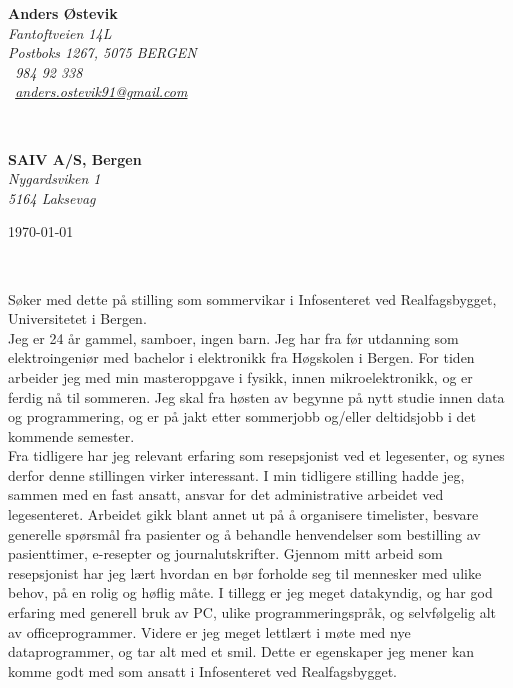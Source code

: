 \documentclass[11pt, norsk]{article}
\begin{document}
\sffamily   %
\hfill%
\begin{minipage}[t]{.6\textwidth}
\raggedleft%
{\bfseries Anders Østevik}\\[.35ex]
\small\itshape%
Fantoftveien 14L\\
Postboks 1267, 5075 BERGEN\\[.35ex]
\Telefon~984 92 338\\
\Letter~\href{mailto:anders.ostevik91@gmail.com}{anders.ostevik91@gmail.com}
\end{minipage}\\[1em]
%
\begin{minipage}[t]{.4\textwidth}
\raggedright%
{\bfseries SAIV A/S, Bergen}\\[.35ex]
\small\itshape%
Nygardsviken 1\\
5164 Laksevag
\end{minipage}
\hfill %
\begin{minipage}[t]{.4\textwidth}
\raggedleft %
\today
\end{minipage}\\[2em]
\raggedright

%
Søker med dette på stilling som sommervikar i Infosenteret ved Realfagsbygget, Universitetet i Bergen.\\[1.5em]
Jeg er 24 år gammel, samboer, ingen barn. Jeg har fra før utdanning som elektroingeniør med bachelor i elektronikk fra Høgskolen i Bergen. For tiden arbeider jeg med min masteroppgave i fysikk, innen mikroelektronikk, og er ferdig nå til sommeren. Jeg skal fra høsten av begynne på nytt studie innen data og programmering, og er på jakt etter sommerjobb og/eller deltidsjobb i det kommende semester.\\[1.0em]

Fra tidligere har jeg relevant erfaring som resepsjonist ved et legesenter, og synes derfor denne stillingen virker interessant. I min tidligere stilling hadde jeg, sammen med en fast ansatt, ansvar for det administrative arbeidet ved legesenteret. Arbeidet gikk blant annet ut på å organisere timelister, besvare generelle spørsmål fra pasienter og å behandle henvendelser som bestilling av pasienttimer, e-resepter og journalutskrifter. Gjennom mitt arbeid som resepsjonist har jeg lært hvordan en bør forholde seg til mennesker med ulike behov, på en rolig og høflig måte. I tillegg er jeg meget datakyndig, og har god erfaring med generell bruk av PC, ulike programmeringspråk, og selvfølgelig alt av officeprogrammer. Videre er jeg meget lettlært i møte med nye dataprogrammer, og tar alt med et smil. Dette er egenskaper jeg mener kan komme godt med som ansatt i Infosenteret ved Realfagsbygget. \\[1.5em]
\end{document}
